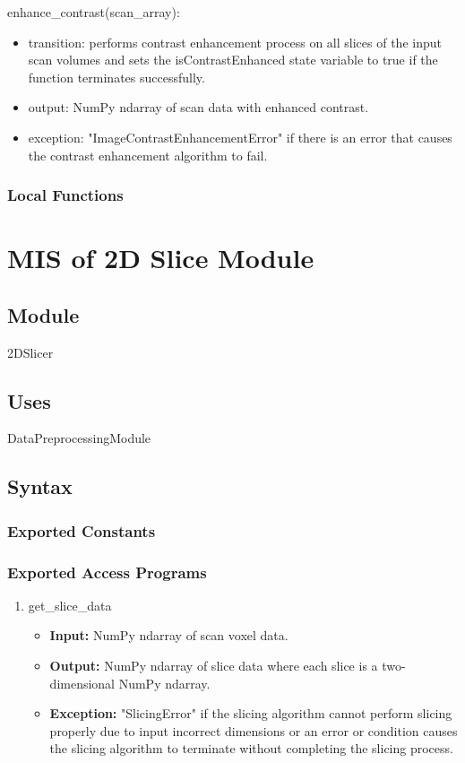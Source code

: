 \documentclass[12pt, titlepage]{article}
\begin{document}
\noindent enhance\_contrast(scan\_array):
\begin{itemize}
  \item transition: performs contrast enhancement process on all slices of
        the input scan volumes and sets the isContrastEnhanced state variable to true
        if the function terminates successfully.
  \item output: NumPy ndarray of scan data with enhanced contrast.
  \item exception: "ImageContrastEnhancementError" if there is an error that causes the
        contrast enhancement algorithm to fail.
\end{itemize}

\subsubsection{Local Functions}

\newpage


\section{MIS of 2D Slice Module} \label{2DS}


\subsection{Module}

2DSlicer
\subsection{Uses}
DataPreprocessingModule

\subsection{Syntax}

\subsubsection{Exported Constants}

\subsubsection{Exported Access Programs}

\begin{enumerate}
  \item get\_slice\_data
        \begin{itemize}
          \item \textbf{Input:} NumPy ndarray of scan voxel data.
          \item \textbf{Output:} NumPy ndarray of slice data where each slice is a two-dimensional NumPy ndarray.
          \item \textbf{Exception:} "SlicingError" if the slicing algorithm cannot perform slicing properly due
                to input incorrect dimensions or an error or condition causes the slicing algorithm to terminate without completing the slicing process.
        \end{itemize}

\end{enumerate}
\end{document}
